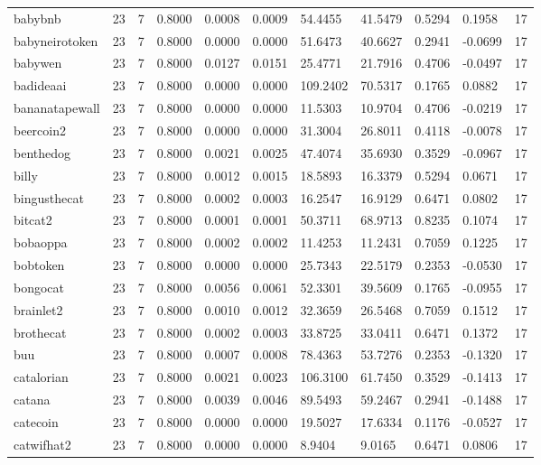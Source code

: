 \begin{table}[htbp]
\begin{tabular}{lllllllllll}
babybnb & 23 & 7 & 0.8000 & 0.0008 & 0.0009 & 54.4455 & 41.5479 & 0.5294 & 0.1958 & 17 \\
babyneirotoken & 23 & 7 & 0.8000 & 0.0000 & 0.0000 & 51.6473 & 40.6627 & 0.2941 & -0.0699 & 17 \\
babywen & 23 & 7 & 0.8000 & 0.0127 & 0.0151 & 25.4771 & 21.7916 & 0.4706 & -0.0497 & 17 \\
badideaai & 23 & 7 & 0.8000 & 0.0000 & 0.0000 & 109.2402 & 70.5317 & 0.1765 & 0.0882 & 17 \\
bananatapewall & 23 & 7 & 0.8000 & 0.0000 & 0.0000 & 11.5303 & 10.9704 & 0.4706 & -0.0219 & 17 \\
beercoin2 & 23 & 7 & 0.8000 & 0.0000 & 0.0000 & 31.3004 & 26.8011 & 0.4118 & -0.0078 & 17 \\
benthedog & 23 & 7 & 0.8000 & 0.0021 & 0.0025 & 47.4074 & 35.6930 & 0.3529 & -0.0967 & 17 \\
billy & 23 & 7 & 0.8000 & 0.0012 & 0.0015 & 18.5893 & 16.3379 & 0.5294 & 0.0671 & 17 \\
bingusthecat & 23 & 7 & 0.8000 & 0.0002 & 0.0003 & 16.2547 & 16.9129 & 0.6471 & 0.0802 & 17 \\
bitcat2 & 23 & 7 & 0.8000 & 0.0001 & 0.0001 & 50.3711 & 68.9713 & 0.8235 & 0.1074 & 17 \\
bobaoppa & 23 & 7 & 0.8000 & 0.0002 & 0.0002 & 11.4253 & 11.2431 & 0.7059 & 0.1225 & 17 \\
bobtoken & 23 & 7 & 0.8000 & 0.0000 & 0.0000 & 25.7343 & 22.5179 & 0.2353 & -0.0530 & 17 \\
bongocat & 23 & 7 & 0.8000 & 0.0056 & 0.0061 & 52.3301 & 39.5609 & 0.1765 & -0.0955 & 17 \\
brainlet2 & 23 & 7 & 0.8000 & 0.0010 & 0.0012 & 32.3659 & 26.5468 & 0.7059 & 0.1512 & 17 \\
brothecat & 23 & 7 & 0.8000 & 0.0002 & 0.0003 & 33.8725 & 33.0411 & 0.6471 & 0.1372 & 17 \\
buu & 23 & 7 & 0.8000 & 0.0007 & 0.0008 & 78.4363 & 53.7276 & 0.2353 & -0.1320 & 17 \\
catalorian & 23 & 7 & 0.8000 & 0.0021 & 0.0023 & 106.3100 & 61.7450 & 0.3529 & -0.1413 & 17 \\
catana & 23 & 7 & 0.8000 & 0.0039 & 0.0046 & 89.5493 & 59.2467 & 0.2941 & -0.1488 & 17 \\
catecoin & 23 & 7 & 0.8000 & 0.0000 & 0.0000 & 19.5027 & 17.6334 & 0.1176 & -0.0527 & 17 \\
catwifhat2 & 23 & 7 & 0.8000 & 0.0000 & 0.0000 & 8.9404 & 9.0165 & 0.6471 & 0.0806 & 17 \\

\end{tabular}
\end{table}
